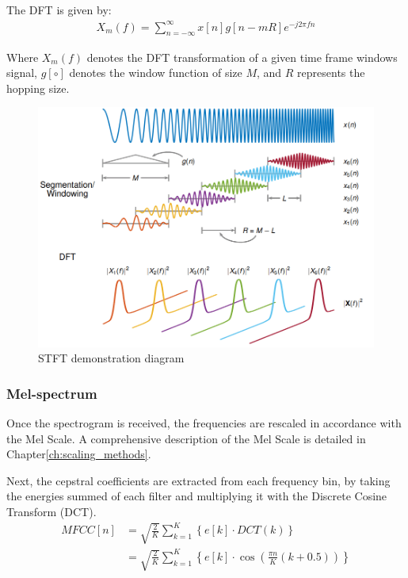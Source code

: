 The DFT is given by:
\begin{align}
    X_{m}(f) = \sum_{n=-\infty}^{\infty} x[n]g[n-mR]e^{-j2\pi fn}
\end{align}

Where \(X_{m}(f)\) denotes the DFT transformation of
a given time frame windows signal,
\(g[\circ]\) denotes the window function of size \(M\),
and \(R\) represents the hopping size.

\begin{figure}[H]
    \centering
    \includegraphics[width=\linewidth]{Features/images/iscola_stft}
    \caption{STFT demonstration diagram}\label{fig:iscola_stft}
\end{figure}

\subsubsection{Mel-spectrum}
Once the spectrogram is received, 
the frequencies are rescaled in accordance with the Mel Scale.
A comprehensive description of the Mel Scale 
is detailed in Chapter\;\ref{ch:scaling_methods}.

Next, the cepstral coefficients are extracted from each frequency bin, 
by taking the energies summed of each filter and multiplying it
with the Discrete Cosine Transform (DCT).
\begin{align}\label{eq:mfcc}
    MFCC[n] & = \sqrt{\frac{2}{K}} \sum_{k=1}^{K} \left\{ 
        e[k] \cdot DCT\left( k \right)
     \right\} \nonumber \\
     & = \sqrt{\frac{2}{K}} \sum_{k=1}^{K} \left\{ 
        e[k] \cdot \cos \left( \frac{\pi n}{K} (k+0.5) \right)
     \right\}
\end{align}

